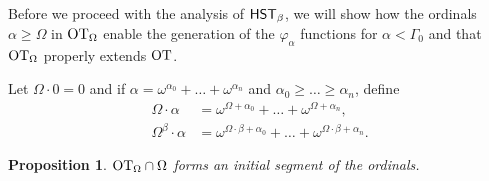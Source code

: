 \documentclass[UKenglish,cleveref,DIV=12]{scrartcl}
\newtheorem{proposition}[lemma]{Proposition}
\theoremstyle{definition}
\theoremstyle{definition}
\begin{document}
Before we proceed with the analysis of $\mathsf{HST}_\beta$, we will show how the ordinals
$\alpha\ge\Omega$ in $\mathrm{OT}_\Omega$ enable the generation of the $\varphi_\alpha$
functions for $\alpha<\Gamma_0$ and that $\mathrm{OT}_\Omega$ properly extends $\mathrm{OT}$.

Let $\Omega\cdot0=0$ and if $\alpha=\omega^{\alpha_0}+\dots+\omega^{\alpha_n}$
and $\alpha_0\ge\dots\ge\alpha_n$, define
\begin{align*}
  \Omega\cdot\alpha&=\omega^{\Omega+\alpha_0}+\dots+\omega^{\Omega+\alpha_n},\\
  \Omega^\beta\cdot\alpha&=\omega^{\Omega\cdot\beta+\alpha_0}+
\dots+\omega^{\Omega\cdot\beta+\alpha_n}.
\end{align*}
\begin{proposition}\label{extprop:thetaord}
 $\mathrm{OT}_\Omega\cap \Omega$ forms an initial segment of the ordinals.
\end{proposition}
\end{document}
